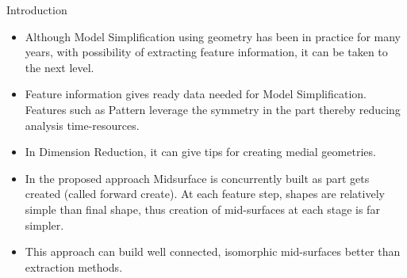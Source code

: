 
\begin{frame}{Introduction}
\begin{itemize}
\item Although Model Simplification using geometry has been in practice for many years, with possibility of extracting feature information, it can be taken to the next level. 
\item Feature information gives ready data needed for Model Simplification.  Features such as Pattern leverage the symmetry in the part thereby reducing analysis time-resources. 
\item In Dimension Reduction, it can give tips for creating medial geometries.
\item In the proposed approach Midsurface is concurrently built as part gets created (called forward create). At each feature step, shapes are relatively simple than final shape, thus creation of mid-surfaces at each stage is far simpler. 
\item This approach can build well connected, isomorphic mid-surfaces better than extraction methods. 
\end{itemize}


\end{frame}
